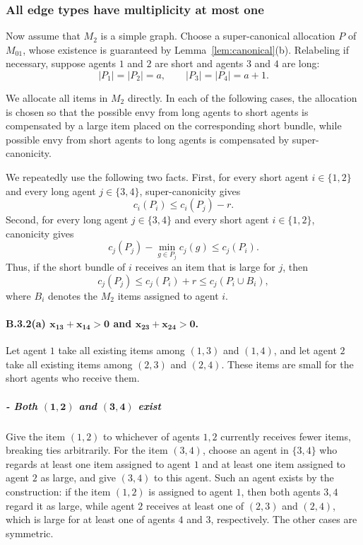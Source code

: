 \documentclass{article}
\theoremstyle{definition}
\begin{document}
\subsubsection{All edge types have multiplicity at most one}

Now assume that $M_2$ is a simple graph.  Choose a super-canonical
allocation $P$ of $M_{01}$, whose existence is guaranteed by
Lemma~\ref{lem:canonical}(b).  Relabeling if necessary, suppose agents $1$
and $2$ are short and agents $3$ and $4$ are long:
\[
    |P_1|=|P_2|=a,
    \qquad
    |P_3|=|P_4|=a+1.
\]

We allocate all items in $M_2$ directly.  In each of the following cases, the
allocation is chosen so that the possible envy from long agents to short agents
is compensated by a large item placed on the corresponding short bundle, while
possible envy from short agents to long agents is compensated by
super-canonicity.

We repeatedly use the following two facts.  First, for every short agent
$i\in\{1,2\}$ and every long agent $j\in\{3,4\}$, super-canonicity gives
\begin{equation}\label{eqn:b2-super}
    c_i(P_i)\le c_i(P_j)-r.
\end{equation}
Second, for every long agent $j\in\{3,4\}$ and every short agent
$i\in\{1,2\}$, canonicity gives
\begin{equation}\label{eqn:b2-long-short}
    c_j(P_j)-\min_{g\in P_j}c_j(g)\le c_j(P_i).
\end{equation}
Thus, if the short bundle of $i$ receives an item that is large for $j$, then
\[
    c_j(P_j)\le c_j(P_i)+r\le c_j(P_i\cup B_i),
\]
where $B_i$ denotes the $M_2$ items assigned to agent $i$.

\paragraph{B.3.2(a) $\boldsymbol{x_{13}+x_{14}>0}$ and $\boldsymbol{x_{23}+x_{24}>0}$.}

Let agent $1$ take all existing items among $(1,3)$ and $(1,4)$, and let
agent $2$ take all existing items among $(2,3)$ and $(2,4)$.  These items are
small for the short agents who receive them.

\subparagraph{- Both $\boldsymbol{(1,2)}$ and $\boldsymbol{(3,4)}$ exist} Give the item $(1,2)$ to whichever of
agents $1,2$ currently receives fewer items, breaking ties arbitrarily.  For
the item $(3,4)$, choose an agent in $\{3,4\}$ who regards at least one item
assigned to agent $1$ and at least one item assigned to agent $2$ as large,
and give $(3,4)$ to this agent.  Such an agent exists by the construction:
if the item $(1,2)$ is assigned to agent $1$, then both agents $3,4$ regard
it as large, while agent $2$ receives at least one of $(2,3)$ and $(2,4)$,
which is large for at least one of agents $4$ and $3$, respectively.  The
other cases are symmetric.
\end{document}
